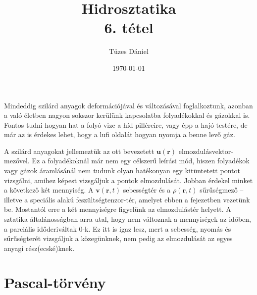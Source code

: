 \documentclass[12pt,a4paper]{scrartcl}
\title{Hidrosztatika\\{\small{6. tétel}}}
\author{Tüzes Dániel}
\date{\today}
\let\mathbf\bm
\begin{document}
\maketitle

Mindeddig szilárd anyagok deformációjával és változásával foglalkoztunk, azonban a való életben nagyon sokszor kerülünk kapcsolatba folyadékokkal és gázokkal is. Fontos tudni hogyan hat a folyó vize a híd pilléreire, vagy épp a hajó testére, de már az is érdekes lehet, hogy a lufi oldalát hogyan nyomja a benne levő gáz.

A szilárd anyagokat jellemeztük az ott bevezetett ${\mathbf{u}}\left( {\mathbf{r}} \right)$ elmozdulásvektor-mezővel. Ez a folyadékoknál már nem egy célszerű leírási mód, hiszen folyadékok vagy gázok áramlásánál nem tudunk olyan hatékonyan egy kitüntetett pontot vizsgálni, amihez képest vizsgáljuk a pontok elmozdulását. Jobban érdekel minket a következő két mennyiség. A ${\mathbf{v}}\left( {{\mathbf{r}},t} \right)$ sebességtér és a $\rho \left( {{\mathbf{r}},t} \right)$ sűrűségmező -- illetve a speciális alakú feszültségtenzor-tér, amelyet ebben a fejezetben vezetünk be. Mostantól erre a két mennyiségre figyelünk az elmozdulástér helyett. A sztatika általánosságban arra utal, hogy nem változnak a mennyiségek az időben, a parciális időderiváltak 0-k. Ez itt is igaz lesz, mert a sebesség, nyomás és sűrűségterét vizsgáljuk a közegünknek, nem pedig az elmozdulását az egyes anyagi rész(ecské)knek.

\section{Pascal-törvény}
\end{document}

